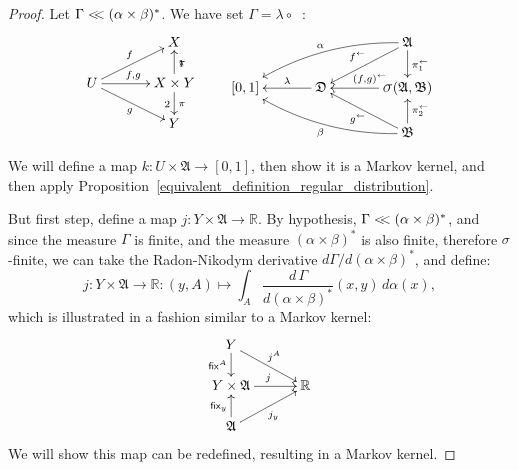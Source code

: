 \documentclass[
twoside=true,
paper=letter,
fontsize=9pt,
pagesize=auto,
leqno,
openany,
headsepline,
overfullrule,
]{scrbook}
\theoremstyle{plain}
\theoremstyle{plain}
\theoremstyle{definition}
\theoremstyle{bfnoteitalic}
\theoremstyle{bfnoteroman}
\newcommand{\sigalg}[1]{\mathfrak{#1}}
\newcommand{\sfop}[1]{\mathsf{#1}}
\newcommand{\sagb}{\mathop{\hbox{\large{$\sigma$}}}\nolimits}
\newcommand{\textsigma}{\hbox{\large{$\sigma$}}\kern-1pt}
\newcommand{\preimage}[1]{\mathop{#1^{\leftarrow}}}
\newcommand{\R}{\mathbb{R}}
\newcommand{\sigmaalgebra}{\sigalg{A}}
\newcommand{\sigmaalgebraii}{\sigalg{B}}
\newcommand{\productsig}[2]{\sagb(#1,#2)}
\newcommand{\funcf}{f}
\newcommand{\funcg}{g}
\newcommand{\funcj}{j}
\newcommand{\funck}{k}
\newcommand{\measurespace}{X}
\newcommand{\measurespaceii}{Y}
\newcommand{\mspaceelt}{x}
\newcommand{\mspaceeltii}{y}
\newcommand{\abscont}{\mathrel{< \kern-3.5pt <}}
\newcommand{\measlambda}{\lambda}
\newcommand{\seti}{A}
\newcommand{\projectionone}{\pi_1}
\newcommand{\projectiontwo}{\pi_2}
\newcommand{\fixinthefirst}[1]{\sfop{fix}_{#1}}
\newcommand{\fixinthesecond}[1]{\sfop{fix}^{#1}}
\newcommand{\uspace}{U}%
\newcommand{\uspacesig}{\sigalg{D}}
\newcommand{\joint}{\Gamma}%
\newcommand{\measonprod}{\Gamma}%
\newcommand{\marginalone}{\alpha}%
\newcommand{\marginaltwo}{\beta}%
\begin{document}
\begin{proof}
Let $\joint \abscont (\marginalone\times\marginaltwo)^*$.
We have set
$\joint = \measlambda\circ\preimage{({\funcf,\funcg})}$:
\[
\xymatrix@R=16pt@C=34pt{
 & \measurespace
 \\
 \uspace
 \ar[ur]^{\funcf}
 \ar[dr]_{\funcg}
 \ar[r]^{\funcf, \funcg} &
 \measurespace \times \measurespaceii  \ar[u]_\projectionone \ar[d]^\projectiontwo
 \\
 & \measurespaceii  \\
}
\qquad
\xymatrix@R=18pt@C=34pt{
 & & \sigmaalgebra
 \ar[dl]_{\preimage{\funcf}}
 \ar[d]^{\preimage{\projectionone}}
 \ar@/_10pt/[lld]_{\marginalone}
 \\
 [0,1] & \uspacesig \ar[l]_-{\measlambda} &
 \productsig{\sigmaalgebra}{\sigmaalgebraii}
 \ar[l]_{\hskip8pt \preimage{(\funcf,\funcg)}}
 \\
 & & \sigmaalgebraii
  \ar[u]_{\preimage{\projectiontwo}}
  \ar[ul]^{\preimage{\funcg}}
  \ar@/^10pt/[llu]^{\marginaltwo}
  \\
}
\]

We will define a map
$\funck: \uspace\times \sigmaalgebra \to [0,1]$, then show it is a Markov kernel, and then apply Proposition~\ref{equivalent_definition_regular_distribution}.


But first step, define a map
$\funcj:\measurespaceii\times\sigmaalgebra\to \R$. By hypothesis,
$\measonprod \abscont (\marginalone\times\marginaltwo)^*$, and since the measure
$\measonprod$ is finite, and the measure $(\marginalone\times\marginaltwo)^*$ is also finite, therefore \textsigma\hyp{}finite, we can take the Radon-Nikodym derivative
$d\measonprod / d(\marginalone\times\marginaltwo)^*$, and define:
\[
\funcj
:\measurespaceii\times\sigmaalgebra\to \R
:(\mspaceeltii,\seti)\mapsto
\int_\seti
\dfrac{d\,\measonprod}{d(\marginalone\times\marginaltwo)^*}
(\mspaceelt,\mspaceeltii)\, d\marginalone(\mspaceelt),
\]
which is illustrated in a fashion similar to a Markov kernel:
\[
\xymatrix@R=16pt@C=30pt{
\measurespaceii
\ar[d]_-{\fixinthesecond{\seti}}
\ar[dr]^{\funcj^\seti} &
\\
\measurespaceii\times\sigmaalgebra \ar[r]^{\funcj} & \R
\\
\sigmaalgebra
\ar[ur]_{\funcj_\mspaceeltii}
\ar[u]^{\fixinthefirst{\mspaceeltii}} &
\\
}
\]
We will show this map can be redefined, resulting in a  Markov kernel.


\end{proof}
\end{document}
